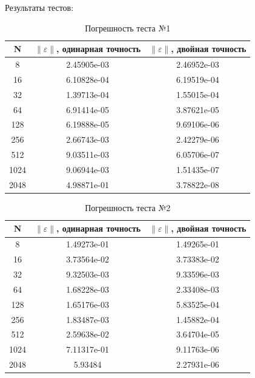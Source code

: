 Результаты тестов:
  \begin{table}[H]
    \centering
    \begin{tabular}{c | c | c}
      \toprule
      N & $ \left\lVert \varepsilon \right\rVert  $, одинарная точность & $ \left\lVert \varepsilon \right\rVert  $, двойная точность \\
      \midrule
      8 & 2.45905e-03 & 2.46952e-03\\
      16 & 6.10828e-04 & 6.19519e-04\\
      32 & 1.39713e-04 & 1.55015e-04\\
      64 & 6.91414e-05 & 3.87621e-05\\
      128 & 6.19888e-05 & 9.69106e-06\\
      256 & 2.66743e-03 & 2.42279e-06\\
      512 & 9.03511e-03 & 6.05706e-07\\
      1024 & 9.06944e-03 & 1.51435e-07\\
      2048 & 4.98871e-01 & 3.78822e-08\\
      \bottomrule
    \end{tabular}
    \caption{Погрешность теста №1}
  \end{table}

  \begin{table}[H]
    \centering
    \begin{tabular}{c | c | c}
      \toprule
      N & $ \left\lVert \varepsilon \right\rVert  $, одинарная точность & $ \left\lVert \varepsilon \right\rVert  $, двойная точность \\
      \midrule
      8 & 1.49273e-01 & 1.49265e-01\\
      16 & 3.73564e-02 & 3.73383e-02\\
      32 & 9.32503e-03 & 9.33596e-03\\
      64 & 1.68228e-03 & 2.33408e-03\\
      128 & 1.65176e-03 & 5.83525e-04\\
      256 & 1.83487e-03 & 1.45882e-04\\
      512 & 2.59638e-02 & 3.64704e-05\\
      1024 & 7.11317e-01 & 9.11763e-06\\
      2048 & 5.93484 & 2.27931e-06\\
      \bottomrule
    \end{tabular}
    \caption{Погрешность теста №2}
  \end{table}

